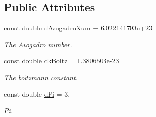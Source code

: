 \subsection*{Public Attributes}
\begin{DoxyCompactItemize}
\item 
\mbox{\label{classUtils_1_1Parameters_adce7e8fb0230d27d1553c05d793bcf97}} 
const double \mbox{\hyperlink{classUtils_1_1Parameters_adce7e8fb0230d27d1553c05d793bcf97}{d\+Avogadro\+Num}} = 6.\+022141793e+23
\begin{DoxyCompactList}\small\item\em The Avogadro number. \end{DoxyCompactList}\item 
\mbox{\label{classUtils_1_1Parameters_ab812c09a17b16a614115b80995aac582}} 
const double \mbox{\hyperlink{classUtils_1_1Parameters_ab812c09a17b16a614115b80995aac582}{dk\+Boltz}} = 1.\+3806503e-\/23
\begin{DoxyCompactList}\small\item\em The boltzmann constant. \end{DoxyCompactList}\item 
\mbox{\label{classUtils_1_1Parameters_a7118286f5e28f6eb7944d7c04e729e32}} 
const double \mbox{\hyperlink{classUtils_1_1Parameters_a7118286f5e28f6eb7944d7c04e729e32}{d\+Pi}} = 3.
\begin{DoxyCompactList}\small\item\em Pi. \end{DoxyCompactList}\end{DoxyCompactItemize}
